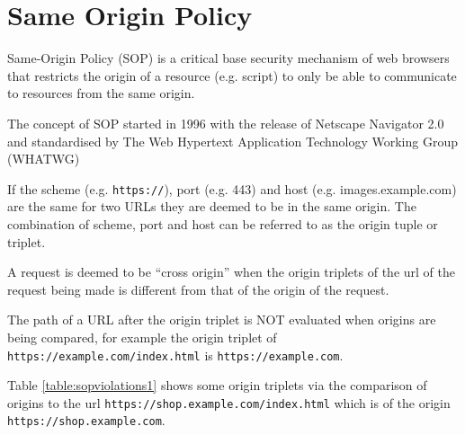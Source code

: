 \documentclass{mscreport}
\begin{document}
\section{Same Origin Policy}
\label{section:same_origin_policy}
\vspace{0.3cm} \noindent
Same-Origin Policy (SOP) is a critical base security mechanism of web browsers that restricts the origin of a resource (e.g. script) to only be able to communicate to resources from the same origin.

\vspace{0.3cm} \noindent
The concept of SOP started in 1996 with the release of Netscape Navigator 2.0 \cite{Preston2012-cs} and standardised by The Web Hypertext Application Technology Working Group (WHATWG) \cite{Multiple1996-ju}

\vspace{0.3cm} \noindent
If the scheme (e.g. \texttt{https://}), port (e.g. 443) and host (e.g. images.example.com) are the same for two URLs they are deemed to be in the same origin. The combination of scheme, port and host can be referred to as the origin tuple or triplet.

\vspace{0.3cm} \noindent
A request is deemed to be ``cross origin'' when the origin triplets of the url of the request being made is different from that of the origin of the request.

\vspace{0.3cm} \noindent
The path of a URL after the origin triplet is NOT evaluated when origins are being compared, for example the origin triplet of \texttt{https://example.com/index.html} is \newline \texttt{https://example.com}.

\vspace{0.3cm} \noindent
Table \ref{table:sopviolations1} shows some origin triplets via the comparison of origins to the url \newline \texttt{https://shop.example.com/index.html} which is of the origin \newline \texttt{https://shop.example.com}.
\end{document}
